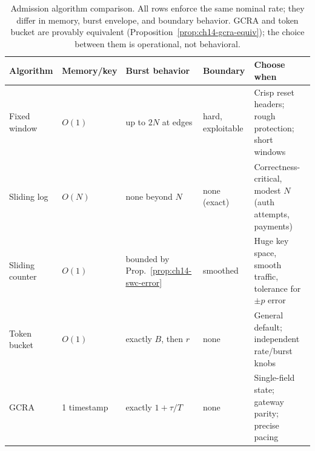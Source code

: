 \begin{table}[ht]
  \centering
  \small
  \begin{tabularx}{\textwidth}{l l l l X}
    \toprule
    \textbf{Algorithm} & \textbf{Memory/key} & \textbf{Burst behavior} &
    \textbf{Boundary} & \textbf{Choose when} \\
    \midrule
    Fixed window & $O(1)$ & up to $2N$ at edges & hard, exploitable &
      Crisp reset headers; rough protection; short windows \\
    Sliding log & $O(N)$ & none beyond $N$ & none (exact) &
      Correctness-critical, modest $N$ (auth attempts, payments) \\
    Sliding counter & $O(1)$ & bounded by Prop.~\ref{prop:ch14-swc-error} &
      smoothed & Huge key space, smooth traffic, tolerance for $\pm p$ error \\
    Token bucket & $O(1)$ & exactly $B$, then $r$ & none &
      General default; independent rate/burst knobs \\
    GCRA & 1 timestamp & exactly $1 + \tau/T$ & none &
      Single-field state; gateway parity; precise pacing \\
    \bottomrule
  \end{tabularx}
  \caption{Admission algorithm comparison. All rows enforce the same
  nominal rate; they differ in memory, burst envelope, and boundary
  behavior. GCRA and token bucket are provably equivalent
  (Proposition~\ref{prop:ch14-gcra-equiv}); the choice between them is
  operational, not behavioral.}
  \label{tab:ch14-algorithms}
\end{table}

